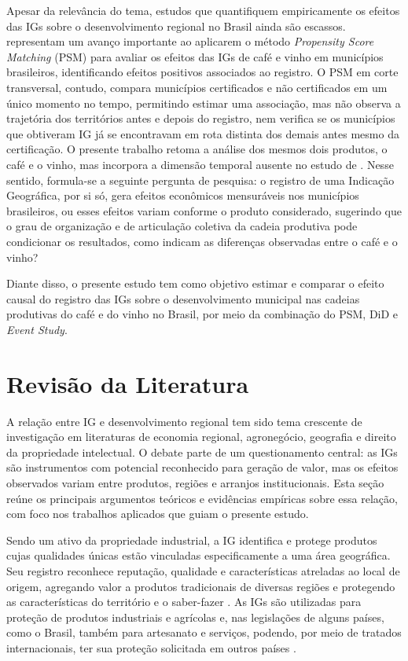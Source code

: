 \documentclass[12pt, a4paper]{article}
\begin{document}
Apesar da relevância do tema, estudos que quantifiquem empiricamente os efeitos das IGs sobre o desenvolvimento regional no Brasil ainda são escassos. \citet{medeiros2021raiher} representam um avanço importante ao aplicarem o método \textit{Propensity Score Matching} (PSM) para avaliar os efeitos das IGs de café e vinho em municípios brasileiros, identificando efeitos positivos associados ao registro. O PSM em corte transversal, contudo, compara municípios certificados e não certificados em um único momento no tempo, permitindo estimar uma associação, mas não observa a trajetória dos territórios antes e depois do registro, nem verifica se os municípios que obtiveram IG já se encontravam em rota distinta dos demais antes mesmo da certificação. O presente trabalho retoma a análise dos mesmos dois produtos, o café e o vinho, mas incorpora a dimensão temporal ausente no estudo de \citet{medeiros2021raiher}. Nesse sentido, formula-se a seguinte pergunta de pesquisa: o registro de uma Indicação Geográfica, por si só, gera efeitos econômicos mensuráveis nos municípios brasileiros, ou esses efeitos variam conforme o produto considerado, sugerindo que o grau de organização e de articulação coletiva da cadeia produtiva pode condicionar os resultados, como indicam as diferenças observadas entre o café e o vinho?

Diante disso, o presente estudo tem como objetivo estimar e comparar o efeito causal do registro das IGs sobre o desenvolvimento municipal nas cadeias produtivas do café e do vinho no Brasil, por meio da combinação do PSM, DiD e \textit{Event Study}.

\section{Revisão da Literatura}

A relação entre IG e desenvolvimento regional tem sido tema crescente de investigação em literaturas de economia regional, agronegócio, geografia e direito da propriedade intelectual. O debate parte de um questionamento central: as IGs são instrumentos com potencial reconhecido para geração de valor, mas os efeitos observados variam entre produtos, regiões e arranjos institucionais. Esta seção reúne os principais argumentos teóricos e evidências empíricas sobre essa relação, com foco nos trabalhos aplicados que guiam o presente estudo.

Sendo um ativo da propriedade industrial, a IG identifica e protege produtos cujas qualidades únicas estão vinculadas especificamente a uma área geográfica. Seu registro reconhece reputação, qualidade e características atreladas ao local de origem, agregando valor a produtos tradicionais de diversas regiões e protegendo as características do território e o saber-fazer \citep{meggiolaro2020, rangel2023}. As IGs são utilizadas para proteção de produtos industriais e agrícolas e, nas legislações de alguns países, como o Brasil, também para artesanato e serviços, podendo, por meio de tratados internacionais, ter sua proteção solicitada em outros países \citep{ompi2022}.
\end{document}

